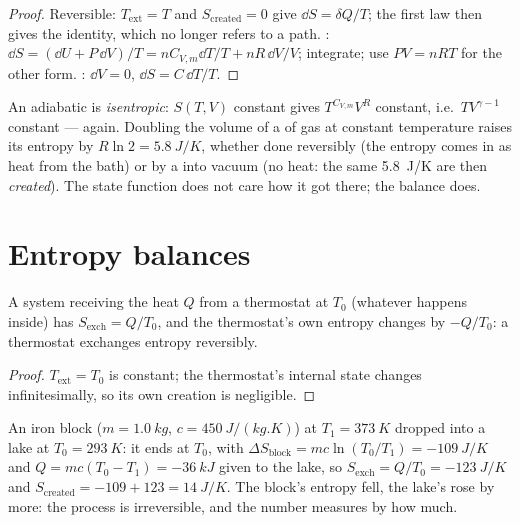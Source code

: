 \begin{proof}
Reversible: $T_{\mathrm{ext}} = T$ and $S_{\mathrm{created}} = 0$ give $\dd S =
\delta Q/T$; the first law then gives the identity, which no longer
refers to a path. : $\dd S = (\dd U + P\,\dd V)/T = nC_{V,m}\dd T/T
+ nR\,\dd V/V$; integrate; use $PV = nRT$ for the other form. : $\dd V = 0$, $\dd S = C\,\dd T/T$.
\end{proof}

\begin{example}\label{ex:b1:second-law-entropy:formulas}
An adiabatic  is \emph{isentropic}: $S(T, V)$
constant gives $T^{C_{V,m}}V^R$ constant, i.e.\ $TV^{\gamma - 1}$ constant ---
 again. Doubling the volume of a  of gas at constant
temperature raises its entropy by $R\ln2 = \qty{5.8}{J/K}$, whether done
reversibly (the entropy comes in as heat from the bath) or by a  into vacuum (no heat: the same \qty{5.8}{J/K} are then
\emph{created}). The state function does not care how it got there;
the balance does.
\end{example}

\section{Entropy balances}

\begin{proposition}\label{prop:b1:second-law-entropy:thermostat}
A system receiving the heat $Q$ from a thermostat at $T_0$ (whatever
happens inside) has $S_{\mathrm{exch}} = Q/T_0$, and the thermostat's own
entropy changes by $-Q/T_0$: a thermostat exchanges entropy reversibly.
\end{proposition}

\begin{proof}
$T_{\mathrm{ext}} = T_0$ is constant; the thermostat's internal state
changes infinitesimally, so its own creation is negligible.
\end{proof}

\begin{example}\label{ex:b1:second-law-entropy:quench}
An iron block ($m = \qty{1.0}{kg}$, $c = \qty{450}{J/(kg.K)}$) at $T_1 =
\qty{373}{K}$ dropped into a lake at $T_0 = \qty{293}{K}$: it ends at $T_0$,
with $\Delta S_{\text{block}} = mc\ln(T_0/T_1) = \qty{-109}{J/K}$ and $Q =
mc(T_0 - T_1) = \qty{-36}{kJ}$ given to the lake, so $S_{\mathrm{exch}} =
Q/T_0 = \qty{-123}{J/K}$ and $S_{\mathrm{created}} = -109 + 123 = \qty{+14}{J/K}$.
The block's entropy fell, the lake's rose by more: the process is
irreversible, and the number measures by how much.
\end{example}

